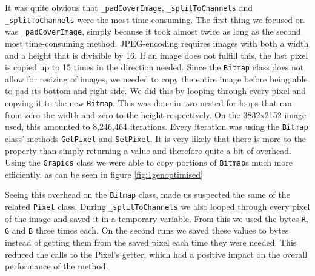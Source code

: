 It was quite obvious that \lstinline|_padCoverImage|, \lstinline|_splitToChannels| and \lstinline|_splitToChannels| were the most time-consuming.
The first thing we focused on was \lstinline|_padCoverImage|, simply because it took almost twice as long as the second most time-consuming method.
JPEG-encoding requires images with both a width and a height that is divisible by 16.
If an image does not fulfill this, the last pixel is copied up to 15 times in the direction needed.
Since the \lstinline|Bitmap| class does not allow for resizing of images, we needed to copy the entire image before being able to pad its bottom and right side.
We did this by looping through every pixel and copying it to the new \lstinline|Bitmap|.
This was done in two nested for-loops that ran from zero the width and zero to the height respectively.
On the 3832x2152 image used, this amounted to 8,246,464 iterations. 
Every iteration was using the \lstinline|Bitmap| class' methods \lstinline|GetPixel| and \lstinline|SetPixel|.
It is very likely that there is more to the property than simply returning a value and therefore quite a bit of overhead.
Using the \lstinline|Grapics| class we were able to copy portions of \lstinline|Bitmap|s much more efficiently,\citep{MSDNBitmap} as can be seen in figure \ref{fig:1genoptimised}

Seeing this overhead on the \lstinline|Bitmap| class, made us suspected the same of the related \lstinline|Pixel| class. 
During \lstinline|_splitToChannels| we also looped through every pixel of the image and saved it in a temporary variable. 
From this we used the bytes \lstinline|R|, \lstinline|G| and \lstinline|B| three times each. 
On the second runs we saved these values to bytes instead of getting them from the saved pixel each time they were needed.
This reduced the calls to the Pixel's getter, which had a positive impact on the overall performance of the method.

